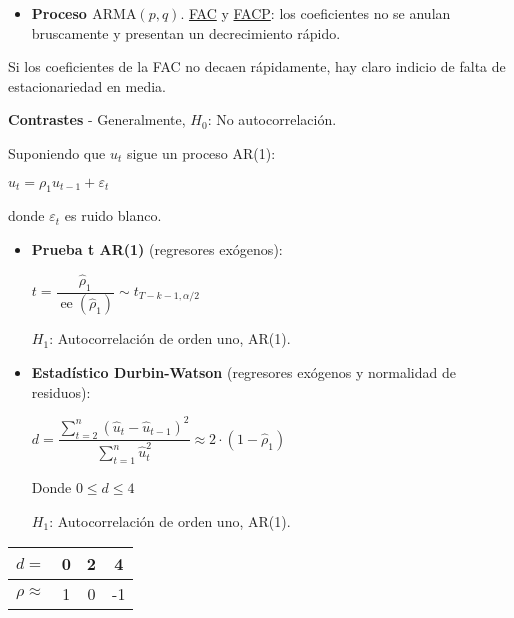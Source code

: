 \documentclass[10pt, a4paper, landscape]{article}
\DeclareMathOperator{\se}{ee}
\begin{document}
\begin{multicols}{3}
\begin{itemize}[leftmargin=*]
	\item \textbf{Proceso \( \text{ARMA}(p, q) \)}. \underline{FAC} y \underline{FACP}: los coeficientes no se anulan bruscamente y presentan un decrecimiento rápido.
\end{itemize}

Si los coeficientes de la FAC no decaen rápidamente, hay claro indicio de falta de estacionariedad en media.

\textbf{Contrastes} - Generalmente, \( H_{0} \): No autocorrelación.

Suponiendo que \( u_{t} \) sigue un proceso AR(1):

\begin{center}
	\( u_{t} = \rho_{1} u_{t - 1} + \varepsilon_{t} \)
\end{center}

donde \( \varepsilon_{t} \) es ruido blanco.

\begin{itemize}[leftmargin=*]
	\item \textbf{Prueba t AR(1)} (regresores exógenos):
	\begin{center}
		\( t = \dfrac{\hat{\rho}_{1}}{\se(\hat{\rho}_{1})} \sim t_{T - k - 1, \alpha / 2} \)
	\end{center}
	\( H_{1} \): Autocorrelación de orden uno, AR(1).
\end{itemize}

\begin{itemize}[leftmargin=*]
	\item \textbf{Estadístico Durbin-Watson} (regresores exógenos y normalidad de residuos):
	\begin{center}
		\( d = \dfrac{\sum_{t = 2}^{n} (\hat{u}_{t} - \hat{u}_{t - 1})^{2}}{\sum_{t = 1}^{n} \hat{u}_{t}^{2}} \approx 2 \cdot (1 - \hat{\rho}_{1}) \)
	\end{center}
	Donde \( 0 \leq d \leq 4 \)

	\( H_{1} \): Autocorrelación de orden uno, AR(1).
\end{itemize}

\begin{center}
	\begin{tabular}{ c | c | c | c }
		\( d = \)          & 0 & 2 & 4  \\ \hline
		\( \rho \approx \) & 1 & 0 & -1
	\end{tabular}


\end{center}
\end{multicols}
\end{document}
